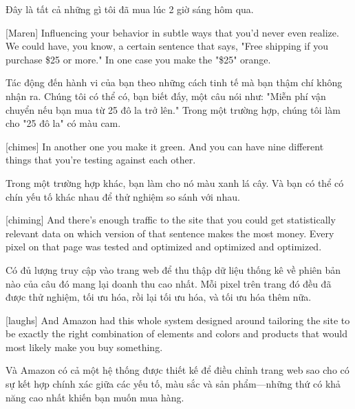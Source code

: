 \documentclass[a4paper]{article}
\begin{document}
	\begin{vietnamese-v2}
		 Đây là tất cả những gì tôi đã mua lúc 2 giờ sáng hôm qua.
	\end{vietnamese-v2}
	
	[Maren] Influencing your behavior in subtle ways that you'd never even realize. We could have, you know, a certain sentence that says, "Free shipping if you purchase \$25 or more." In one case you make the "\$25" orange.

	\begin{vietnamese-v2}
		[Maren] Tác động đến hành vi của bạn theo những cách tinh tế mà bạn thậm chí không nhận ra. Chúng tôi có thể có, bạn biết đấy, một câu nói như: "Miễn phí vận chuyển nếu bạn mua từ 25 đô la trở lên." Trong một trường hợp, chúng tôi làm cho "25 đô la" có màu cam.
	\end{vietnamese-v2}

	[chimes]
	In another one you make it green. And you can have nine different things that you're testing against each other.
	
	\begin{vietnamese-v2}
		Trong một trường hợp khác, bạn làm cho nó màu xanh lá cây. Và bạn có thể có chín yếu tố khác nhau để thử nghiệm so sánh với nhau.
	\end{vietnamese-v2}
	
	[chiming]
	And there's enough traffic to the site that you could get statistically relevant data on which version of that sentence makes the most money.
	Every pixel on that page was tested and optimized and optimized and optimized.
	
	\begin{vietnamese-v2}
		Có đủ lượng truy cập vào trang web để thu thập dữ liệu thống kê về phiên bản nào của câu đó mang lại doanh thu cao nhất. Mỗi pixel trên trang đó đều đã được thử nghiệm, tối ưu hóa, rồi lại tối ưu hóa, và tối ưu hóa thêm nữa.
	\end{vietnamese-v2}
	
	[laughs] And Amazon had this whole system designed around tailoring the site to be exactly the right combination of elements and colors and products that would most likely make you buy something.
	
	\begin{vietnamese-v2}
		[cười] Và Amazon có cả một hệ thống được thiết kế để điều chỉnh trang web sao cho có sự kết hợp chính xác giữa các yếu tố, màu sắc và sản phẩm—những thứ có khả năng cao nhất khiến bạn muốn mua hàng.
	\end{vietnamese-v2}
	
\end{document}
